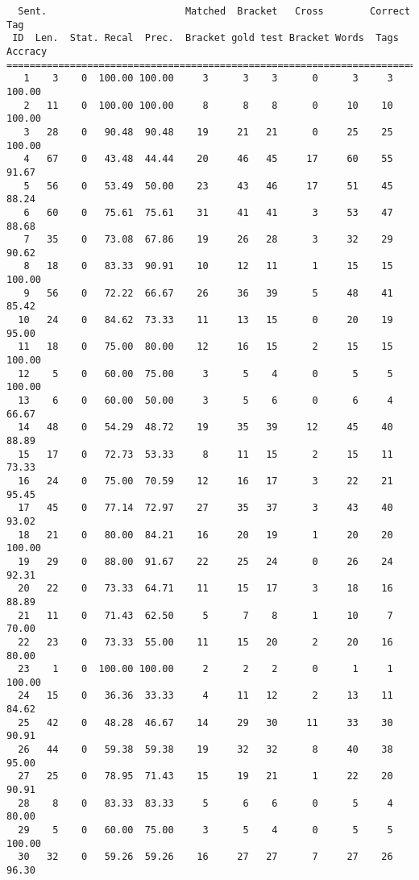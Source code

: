 \scriptsize
\begin{verbatim}
  Sent.                        Matched  Bracket   Cross        Correct Tag
 ID  Len.  Stat. Recal  Prec.  Bracket gold test Bracket Words  Tags Accracy
============================================================================
   1    3    0  100.00 100.00     3      3    3      0      3     3   100.00
   2   11    0  100.00 100.00     8      8    8      0     10    10   100.00
   3   28    0   90.48  90.48    19     21   21      0     25    25   100.00
   4   67    0   43.48  44.44    20     46   45     17     60    55    91.67
   5   56    0   53.49  50.00    23     43   46     17     51    45    88.24
   6   60    0   75.61  75.61    31     41   41      3     53    47    88.68
   7   35    0   73.08  67.86    19     26   28      3     32    29    90.62
   8   18    0   83.33  90.91    10     12   11      1     15    15   100.00
   9   56    0   72.22  66.67    26     36   39      5     48    41    85.42
  10   24    0   84.62  73.33    11     13   15      0     20    19    95.00
  11   18    0   75.00  80.00    12     16   15      2     15    15   100.00
  12    5    0   60.00  75.00     3      5    4      0      5     5   100.00
  13    6    0   60.00  50.00     3      5    6      0      6     4    66.67
  14   48    0   54.29  48.72    19     35   39     12     45    40    88.89
  15   17    0   72.73  53.33     8     11   15      2     15    11    73.33
  16   24    0   75.00  70.59    12     16   17      3     22    21    95.45
  17   45    0   77.14  72.97    27     35   37      3     43    40    93.02
  18   21    0   80.00  84.21    16     20   19      1     20    20   100.00
  19   29    0   88.00  91.67    22     25   24      0     26    24    92.31
  20   22    0   73.33  64.71    11     15   17      3     18    16    88.89
  21   11    0   71.43  62.50     5      7    8      1     10     7    70.00
  22   23    0   73.33  55.00    11     15   20      2     20    16    80.00
  23    1    0  100.00 100.00     2      2    2      0      1     1   100.00
  24   15    0   36.36  33.33     4     11   12      2     13    11    84.62
  25   42    0   48.28  46.67    14     29   30     11     33    30    90.91
  26   44    0   59.38  59.38    19     32   32      8     40    38    95.00
  27   25    0   78.95  71.43    15     19   21      1     22    20    90.91
  28    8    0   83.33  83.33     5      6    6      0      5     4    80.00
  29    5    0   60.00  75.00     3      5    4      0      5     5   100.00
  30   32    0   59.26  59.26    16     27   27      7     27    26    96.30

\end{verbatim}
